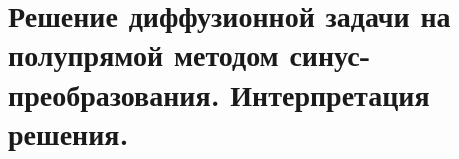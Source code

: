 \chapter{Решение диффузионной задачи на полупрямой методом
синус-преобразования. Интерпретация решения.}

\newpage
